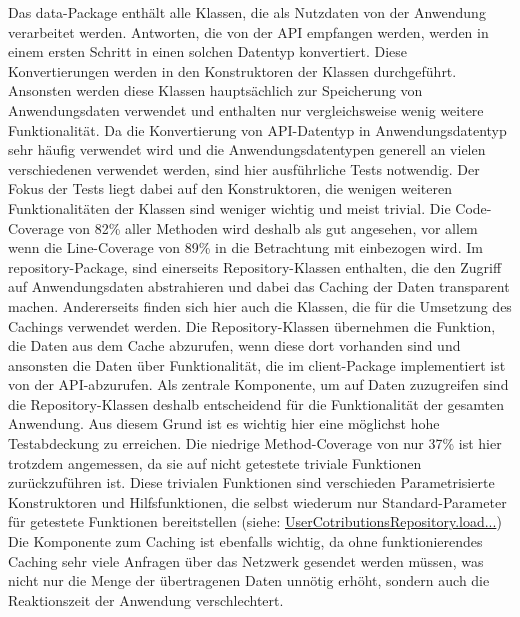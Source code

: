 \newline
\newline
Das data-Package enthält alle Klassen, die als Nutzdaten von der Anwendung verarbeitet werden.
Antworten, die von der API empfangen werden, werden in einem ersten Schritt in einen solchen Datentyp konvertiert.
Diese Konvertierungen werden in den Konstruktoren der Klassen durchgeführt. Ansonsten werden diese Klassen hauptsächlich zur Speicherung von Anwendungsdaten verwendet und enthalten nur vergleichsweise wenig weitere Funktionalität.
Da die Konvertierung von API-Datentyp in Anwendungsdatentyp sehr häufig verwendet wird und die Anwendungsdatentypen generell an vielen verschiedenen verwendet werden, sind hier  ausführliche Tests notwendig.
Der Fokus der Tests liegt dabei auf den Konstruktoren, die wenigen weiteren Funktionalitäten der Klassen sind weniger wichtig und meist trivial.
Die Code-Coverage von 82\% aller Methoden wird deshalb als gut angesehen, vor allem wenn die Line-Coverage von 89\% in die Betrachtung mit einbezogen wird.
\newline
\newline
Im repository-Package, sind einerseits Repository-Klassen enthalten, die den Zugriff auf Anwendungsdaten abstrahieren und dabei das Caching der Daten transparent machen.
Andererseits finden sich hier auch die Klassen, die für die Umsetzung des Cachings verwendet werden.
Die Repository-Klassen übernehmen die Funktion, die Daten aus dem Cache abzurufen, wenn diese dort vorhanden sind und ansonsten die Daten über Funktionalität, die im client-Package implementiert ist von der API-abzurufen.
Als zentrale Komponente, um auf Daten zuzugreifen sind die Repository-Klassen deshalb  entscheidend für die Funktionalität der gesamten Anwendung.
Aus diesem Grund ist es wichtig hier eine möglichst hohe Testabdeckung zu erreichen.
Die niedrige Method-Coverage von nur 37\% ist hier trotzdem angemessen, da sie auf nicht getestete triviale Funktionen zurückzuführen ist.
Diese trivialen Funktionen sind verschieden Parametrisierte Konstruktoren und Hilfsfunktionen, die selbst wiederum nur Standard-Parameter für getestete Funktionen bereitstellen (siehe: \href{https://github.com/lukaspanni/OpenSourceStats/blob/ac3c4098d8f89f5eed7142d675ca49c4d3dd724f/app/src/main/java/de/lukaspanni/opensourcestats/repository/UserContributionsRepository.java#L51-L65}{UserCotributionsRepository.load...})
\newline
Die Komponente zum Caching ist ebenfalls wichtig, da ohne funktionierendes Caching sehr viele Anfragen über das Netzwerk gesendet werden müssen, was nicht nur die Menge der übertragenen Daten unnötig erhöht, sondern auch die Reaktionszeit der Anwendung verschlechtert.

